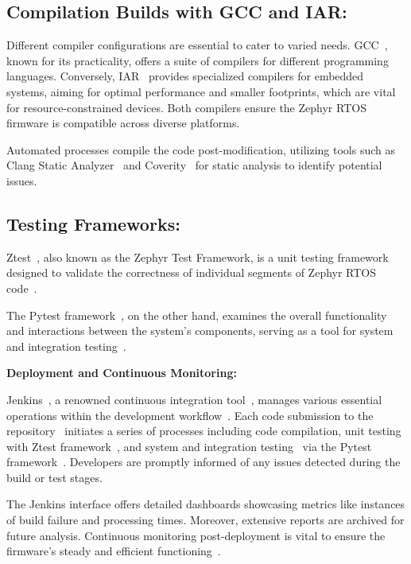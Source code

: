\subsection*{Compilation Builds with GCC and IAR:} Different compiler
configurations are essential to cater to varied needs.
GCC~\cite{GCCtheGN9:online}, known for its practicality, offers a suite of compilers for different
programming languages. Conversely, IAR~\cite{AboutIAR98:online} provides
specialized compilers for embedded systems, aiming for optimal performance and
smaller footprints, which are vital for resource-constrained devices. Both
compilers ensure the Zephyr RTOS firmware is compatible across diverse platforms.

Automated processes compile the code post-modification, utilizing tools such as
Clang Static Analyzer~\cite{kremenek2008finding} and
Coverity~\cite{imtiaz2019developers} for static analysis to identify potential
issues.

\subsection*{Testing Frameworks:}

Ztest~\cite{TestFram11:online}, also known as the Zephyr Test Framework,
is a unit testing framework~\cite{runeson2006survey}
designed to validate the correctness of individual segments of Zephyr RTOS
code~\cite{TestFram11:online}.

The Pytest framework~\cite{hunt2019pytest}, on the other hand, examines the
overall functionality and interactions between the system's components, serving
as a tool for system and integration testing~\cite{TheFourL21:online}.

\textbf{Deployment and Continuous Monitoring:}

Jenkins~\cite{jenkins1963jenkins}, a renowned continuous integration tool~\cite{smart2011jenkins}, manages
various essential operations within the development
workflow~\cite{sayfan2017mastering}. Each code submission to the repository~\cite{milanesio2013learning}
initiates a series of processes including code compilation, unit testing~\cite{runeson2006survey} with
Ztest framework~\cite{TestFram11:online}, and system and integration
testing~\cite{TheFourL21:online} via the Pytest framework~\cite{hunt2019pytest}.
Developers are promptly informed of any issues detected during the build or test
stages.

The Jenkins interface offers detailed dashboards showcasing metrics like
instances of build failure and processing times. Moreover, extensive reports are
archived for future analysis. Continuous monitoring post-deployment is vital to
ensure the firmware's steady and efficient functioning~\cite{mcallister2015mastering}.
\pagebreak

